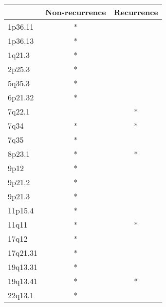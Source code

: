 \begin{tabular}{lcc}
\toprule
{} & Non-recurrence & Recurrence \\
\midrule
1p36.11  &              * &            \\
1p36.13  &              * &            \\
1q21.3   &              * &            \\
2p25.3   &              * &            \\
5q35.3   &              * &            \\
6p21.32  &              * &            \\
7q22.1   &                &          * \\
7q34     &              * &          * \\
7q35     &              * &            \\
8p23.1   &              * &          * \\
9p12     &              * &            \\
9p21.2   &              * &            \\
9p21.3   &              * &            \\
11p15.4  &              * &            \\
11q11    &              * &          * \\
17q12    &              * &            \\
17q21.31 &              * &            \\
19q13.31 &              * &            \\
19q13.41 &              * &          * \\
22q13.1  &              * &            \\
\bottomrule
\end{tabular}
